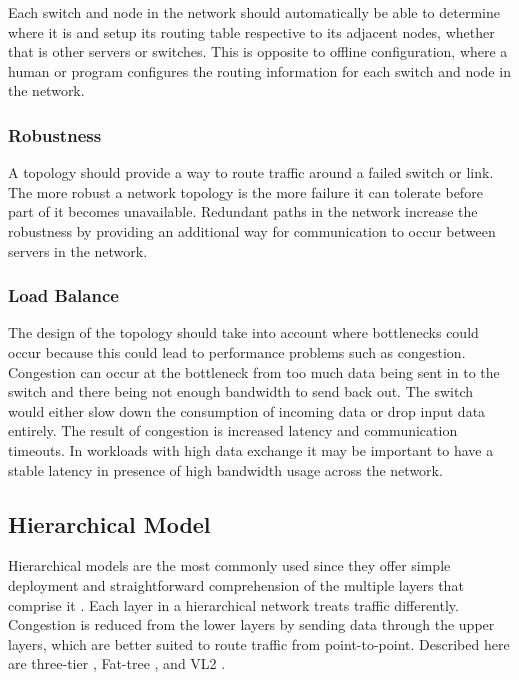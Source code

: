 \documentclass[12pt]{article}
\begin{document}
Each switch and node in the network should automatically be able to determine where it is and setup its routing table respective to its adjacent nodes, whether that is other servers or switches. This is opposite to offline configuration, where a human or program configures the routing information for each switch and node in the network.


\subsubsection{Robustness} \label{ssub:net-robustness}

A topology should provide a way to route traffic around a failed switch or link. The more robust a network topology is the more failure it can tolerate before part of it becomes unavailable. Redundant paths in the network increase the robustness by providing an additional way for communication to occur between servers in the network.


\subsubsection{Load Balance} \label{ssub:net-load-balance}

The design of the topology should take into account where bottlenecks could occur because this could lead to performance problems such as congestion. Congestion can occur at the bottleneck from too much data being sent in to the switch and there being not enough bandwidth to send back out. The switch would either slow down the consumption of incoming data or drop input data entirely. The result of congestion is increased latency and communication timeouts. In workloads with high data exchange it may be important to have a stable latency in presence of high bandwidth usage across the network.





\subsection{Hierarchical Model} \label{sub:net-hierarchical}

Hierarchical models are the most commonly used since they offer simple deployment and straightforward comprehension of the multiple layers that comprise it \cite{wang2015survey, xia2016survey}. Each layer in a hierarchical network treats traffic differently. Congestion is reduced from the lower layers by sending data through the upper layers, which are better suited to route traffic from point-to-point. Described here are three-tier \cite{kliazovich2012greencloud}, Fat-tree \cite{al2008scalable}, and VL2 \cite{greenberg2009vl2}.
\end{document}
